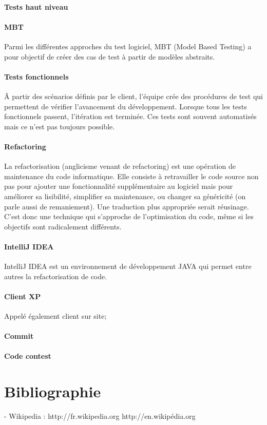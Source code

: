 \documentclass[12pt,oneside]{book}
\begin{document}
\paragraph{Tests haut niveau}

\paragraph{MBT}
Parmi les différentes approches du test logiciel, MBT (Model Based Testing) a pour objectif de créer des cas de test à partir de modèles abstraits.


\paragraph{Tests fonctionnels}
\^A partir des scénarios définis par le client, l'équipe crée des procédures de test qui permettent de vérifier l'avancement du développement. Lorsque tous les tests fonctionnels passent, l'itération est terminée. Ces tests sont souvent automatisés mais ce n'est pas toujours possible.



\paragraph{Refactoring}
La refactorisation (anglicisme venant de refactoring) est une opération de maintenance du code informatique. Elle consiste à retravailler le code source non pas pour ajouter une fonctionnalité supplémentaire au logiciel mais pour améliorer sa lisibilité, simplifier sa maintenance, ou changer sa généricité (on parle aussi de remaniement). Une traduction plus appropriée serait réusinage. C'est donc une technique qui s'approche de l'optimisation du code, même si les objectifs sont radicalement différents. 

\paragraph{IntelliJ IDEA}
IntelliJ IDEA est un environnement de développement JAVA qui permet entre autres la refactorisation de code.
\paragraph{Client XP}
Appelé également client sur site; 

\paragraph{Commit}
 

\paragraph{Code contest}


\section{Bibliographie}

- Wikipedia : 
http://fr.wikipedia.org
http://en.wikipédia.org
\end{document}
